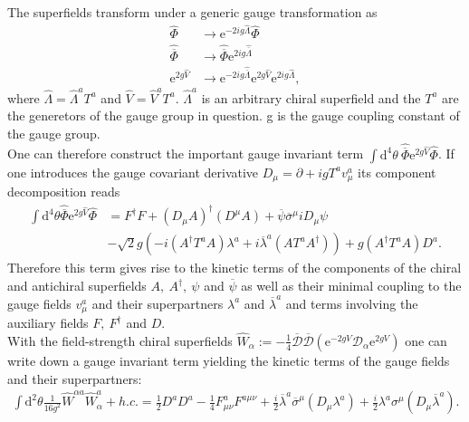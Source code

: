 The superfields transform under a generic gauge transformation as
\begin{align}
\hat{\Phi} &\to \mathrm{e}^{-2ig\hat{\Lambda}}\hat{\Phi}\nonumber\\
\hat{\overline{\Phi}} &\to \hat{\overline{\Phi}}\mathrm{e}^{2ig\hat{\overline{\Lambda}}}\nonumber\\
\mathrm{e}^{2g\hat{V}} &\to \mathrm{e}^{-2ig\hat{\overline{\Lambda}}}\mathrm{e}^{2g\hat{V}} \mathrm{e}^{2ig\hat{\Lambda}},
\end{align}
where $\hat{\Lambda} = \hat{\Lambda}^aT^a$ and $\hat{V} = \hat{V}^aT^a$. $\hat{\Lambda}^a$ is an arbitrary chiral superfield and the $T^a$ are the generetors of the gauge group in question. g is the gauge coupling constant of the gauge group.\\
One can therefore construct the important gauge invariant term $\int\mathrm{d}^4\theta\ \hat{\overline{\Phi}}\mathrm{e}^{2g\hat{V}}\hat{\Phi}$. If one introduces the gauge covariant derivative $D_\mu = \partial + ig T^a v^a_\mu$ its component decomposition reads
\begin{align}
\int\mathrm{d}^4\theta\hat{\overline{\Phi}}\mathrm{e}^{2g\hat{V}}\hat{\Phi} &= F^\dagger F + \left(D_\mu A\right)^\dagger \left(D^\mu A\right) + \overline{\psi}\overline{\sigma}^\mu i D_\mu \psi\nonumber \\
&- \sqrt{2}g\left( -i(A^\dagger T^aA)\lambda^a +i\overline{\lambda}^a(AT^aA^\dagger) \right) + g(A^\dagger T^a A) D^a .\label{eq:L_matter}
\end{align}
Therefore this term gives rise to the kinetic terms of the components of the chiral and antichiral superfields $A,\ A^\dagger,\ \psi$ and $\overline{\psi}$ as well as their minimal coupling to the gauge fields $v_\mu^a$ and their superpartners $\lambda^a$ and $\overline{\lambda}^a$ and terms involving the auxiliary fields $F,\ F^\dagger$ and $D$.\\
With the field-strength chiral superfields $\hat{W}_\alpha := -\frac{1}{4}\overline{\mathcal{D}}\overline{\mathcal{D}}(\mathrm{e}^{-2gV}\mathcal{D}_\alpha\mathrm{e}^{2gV})$ one can write down a gauge invariant term yielding the kinetic terms of the gauge fields and their superpartners:
\begin{align}
\int\mathrm{d}^2\theta \frac{1}{16g^2 }\hat{W}^{\alpha a} \hat{W}^a_\alpha + h.c.= \frac{1}{2}D^aD^a -\frac{1}{4}F^a_{\mu\nu}F^{a\mu\nu} + \frac{i}{2}\overline{\lambda}^a\overline{\sigma}^\mu(D_\mu\lambda^a) + \frac{i}{2}\lambda^a\sigma^\mu(D_\mu\overline{\lambda}^a).\label{eq:L_gauge}
\end{align}

